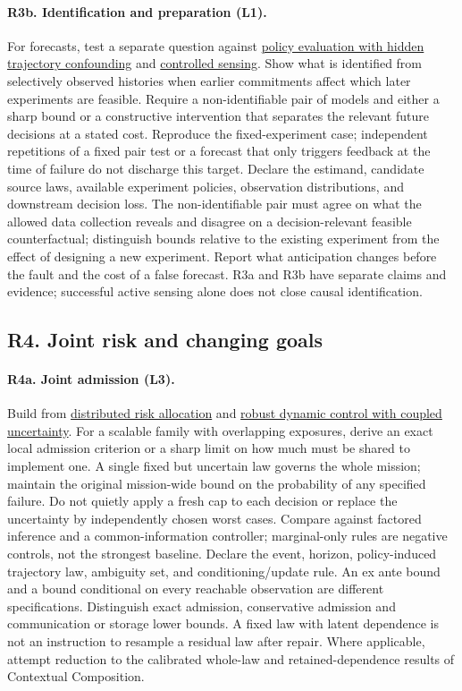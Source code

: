 \documentclass[11pt]{article}
\begin{document}
\paragraph{R3b. Identification and preparation (L1).} For forecasts, test a separate question against \href{https://proceedings.mlr.press/v286/marmarelis25a.html}{policy evaluation with hidden trajectory confounding} and \href{https://arxiv.org/abs/1205.0858}{controlled sensing}. Show what is identified from selectively observed histories when earlier commitments affect which later experiments are feasible. Require a non-identifiable pair of models and either a sharp bound or a constructive intervention that separates the relevant future decisions at a stated cost. Reproduce the fixed-experiment case; independent repetitions of a fixed pair test or a forecast that only triggers feedback at the time of failure do not discharge this target. Declare the estimand, candidate source laws, available experiment policies, observation distributions, and downstream decision loss. The non-identifiable pair must agree on what the allowed data collection reveals and disagree on a decision-relevant feasible counterfactual; distinguish bounds relative to the existing experiment from the effect of designing a new experiment. Report what anticipation changes before the fault and the cost of a false forecast. R3a and R3b have separate claims and evidence; successful active sensing alone does not close causal identification.

\subsection*{R4. Joint risk and changing goals}
\paragraph{R4a. Joint admission (L3).} Build from \href{https://groups.csail.mit.edu/mers/papers/Ono-Williams_AAMAS10.pdf}{distributed risk allocation} and \href{https://arxiv.org/abs/1811.00215}{robust dynamic control with coupled uncertainty}. For a scalable family with overlapping exposures, derive an exact local admission criterion or a sharp limit on how much must be shared to implement one. A single fixed but uncertain law governs the whole mission; maintain the original mission-wide bound on the probability of any specified failure. Do not quietly apply a fresh cap to each decision or replace the uncertainty by independently chosen worst cases. Compare against factored inference and a common-information controller; marginal-only rules are negative controls, not the strongest baseline. Declare the event, horizon, policy-induced trajectory law, ambiguity set, and conditioning/update rule. An ex ante bound and a bound conditional on every reachable observation are different specifications. Distinguish exact admission, conservative admission and communication or storage lower bounds. A fixed law with latent dependence is not an instruction to resample a residual law after repair. Where applicable, attempt reduction to the calibrated whole-law and retained-dependence results of Contextual Composition.
\end{document}
